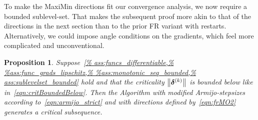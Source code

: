 \documentclass{article}
\theoremstyle{plain}
\newtheorem{proposition}[theorem]{Proposition}
\theoremstyle{definition}
\begin{document}
To make the MaxiMin directions fit our convergence analysis,
we now require a bounded sublevel-set.
That makes the subsequent proof more akin to that of the directions
in the next section than to the prior FR variant with restarts.
Alternatively, we could impose angle conditions on the gradients, which
feel more complicated and unconventional. 
\begin{proposition}
	Suppose~\cref{%
	ass:funcs_differentiable,%
	ass:sublevelset_bounded}
	hold and that the criticality $\left\|\bm{\delta}^{(k)}\right\|$ is 
	bounded below like in~\eqref{eqn:critBoundedBelow}.
	Then the Algorithm with modified Armijo-stepsizes
	according to~\eqref{eqn:armijo_strict} and with directions defined
	by~\eqref{eqn:frMO2} generates a critical subsequence.
\end{proposition}

\end{document}
